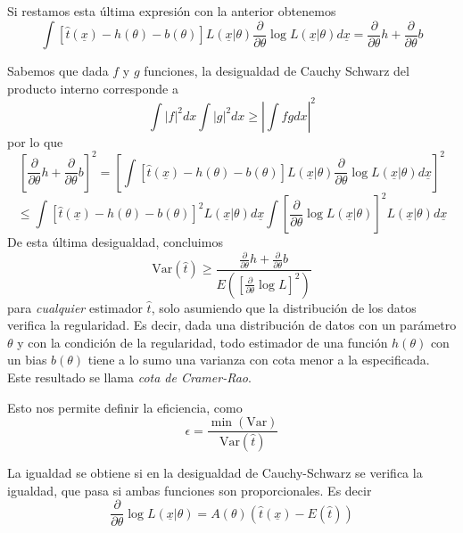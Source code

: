 \documentclass{article}
\numberwithin{equation}{section} %
\begin{document}
Si restamos esta última expresión con la anterior obtenemos
\[\int [\hat{t}(\underline{x}) - h(\theta) - b(\theta)] L(\underline{x}|\theta) \frac{\partial}{\partial \theta} \log L(\underline{x} | \theta) d\underline{x} = \frac{\partial}{\partial \theta} h + \frac{\partial}{\partial \theta} b\]

Sabemos que dada $f$ y $g$ funciones, la desigualdad de Cauchy Schwarz del producto interno corresponde a 
\begin{equation}
\int |f|^2 dx \int |g|^2 dx \geq \left|\int f g dx \right|^2
\end{equation}
por lo que
\[ \left[ \frac{\partial}{\partial \theta} h + \frac{\partial}{\partial \theta} b \right]^2 =  \left[ \int [\hat{t}(\underline{x}) - h(\theta) - b(\theta)] L(\underline{x}|\theta) \frac{\partial}{\partial \theta} \log L(\underline{x} | \theta) d\underline{x} \right]^2\] \[\leq   \int [\hat{t}(\underline{x}) - h(\theta) - b(\theta)]^2 L(\underline{x}|\theta) d\underline{x} \int \left[\frac{\partial}{\partial \theta} \log L(\underline{x} | \theta)\right]^2 L(\underline{x}|\theta) d\underline{x}\]
De esta última desigualdad, concluimos
\begin{equation}
\text{Var}(\hat{t}) \geq \frac{\frac{\partial}{\partial \theta} h + \frac{\partial}{\partial \theta} b}{E\left( \left[\frac{\partial}{\partial \theta} \log L \right]^2\right)}
\end{equation}
para \emph{cualquier} estimador $\hat{t}$, solo asumiendo que la distribución de los datos verifica la regularidad.
Es decir, dada una distribución de datos con un parámetro $\theta$ y con la condición de la regularidad, todo estimador de una función $h(\theta)$ con un bias $b(\theta)$ tiene a lo sumo una varianza con cota menor a la especificada. Este resultado se llama \emph{cota de Cramer-Rao}. 

Esto nos permite definir la eficiencia, como
\begin{equation}
\epsilon = \frac{\min(\text{Var})}{\text{Var}(\hat{t})}
\end{equation}

La igualdad se obtiene si en la desigualdad de Cauchy-Schwarz se verifica la igualdad, que pasa si ambas funciones son proporcionales. Es decir
\begin{equation}
\frac{\partial}{\partial \theta} \log L(\underline{x}|\theta) = A(\theta) (\hat{t}(\underline{x}) - E(\hat{t}))
\end{equation}
\end{document}
